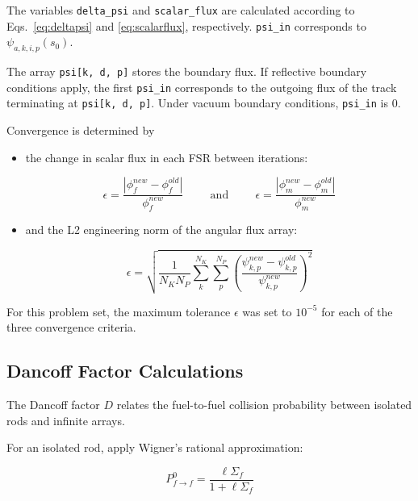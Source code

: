 \documentclass[12pt]{article}
\begin{document}
The variables \texttt{delta\_psi} and \texttt{scalar\_flux} are calculated according to Eqs.~\ref{eq:deltapsi} and \ref{eq:scalarflux}, respectively. \texttt{psi\_in} corresponds to $\psi_{a,k,i,p}(s_0)$.

The array \texttt{psi[k, d, p]} stores the boundary flux. If reflective boundary conditions apply, the first \texttt{psi\_in} corresponds to the outgoing flux of the track terminating at \texttt{psi[k, d, p]}. Under vacuum boundary conditions, \texttt{psi\_in} is 0.

Convergence is determined by

\begin{itemize}
\item the change in scalar flux in each FSR between iterations:

\begin{equation}\label{eq:fluxdiff}
\epsilon = \frac{|\phi_f^{new} - \phi_f^{old}|}{\phi_f^{new}}
\hspace{1cm} \text{and} \hspace{1cm}
\epsilon = \frac{|\phi_m^{new} - \phi_m^{old}|}{\phi_m^{new}}
\end{equation}
\item  and the L2 engineering norm of the angular flux array:

\begin{equation}\label{eq:l2norm}
\epsilon = 
\sqrt{ \frac{1}{N_K N_P} \sum\limits_k^{N_K} \sum\limits_p^{N_P} 
\left( \frac{\psi_{k, p}^{new} - \psi_{k, p}^{old}}{\psi_{k, p}^{new}} \right)^2 }
\end{equation}
\end{itemize}

For this problem set, the maximum tolerance $\epsilon$ was set to $10^{-5}$ for each of the three convergence criteria.

\newpage
\subsection{Dancoff Factor Calculations}\label{sec:dancoff}

The Dancoff factor $D$ relates the fuel-to-fuel collision probability between isolated rods and infinite arrays.

For an isolated rod, apply Wigner's rational approximation:

\begin{equation}\label{eq:pff0}
P_{f \rightarrow f}^0 = \frac{\ell \Sigma_f}{1 + \ell \Sigma_f}
\end{equation}
\end{document}
